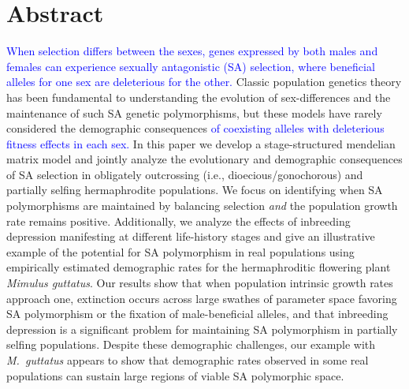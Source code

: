 \documentclass[11pt]{article}
\begin{document}
\linenumbers{}
\modulolinenumbers[3]

\newpage{}



\newpage{}
\section*{Abstract}


\textcolor{blue}{When selection differs between the sexes, genes expressed by both males and females can experience sexually antagonistic (SA) selection, where beneficial alleles for one sex are deleterious for the other.} Classic population genetics theory has been fundamental to understanding the evolution of sex-differences and the maintenance of such SA genetic polymorphisms, but these models have rarely considered the demographic consequences \textcolor{blue}{ of coexisting alleles with deleterious fitness effects in each sex.} In this paper we develop a stage-structured mendelian matrix model and jointly analyze the evolutionary and demographic consequences of SA selection in obligately outcrossing (i.e., dioecious/gonochorous) and partially selfing hermaphrodite populations. We focus on identifying when SA polymorphisms are maintained by balancing selection {\itshape and} the population growth rate remains positive. Additionally, we analyze the effects of inbreeding depression manifesting at different life-history stages and give an illustrative example of the potential for SA polymorphism in real populations using empirically estimated demographic rates for the hermaphroditic flowering plant {\itshape Mimulus guttatus}. Our results show that when population intrinsic growth rates approach one, extinction occurs across large swathes of parameter space favoring SA polymorphism or the fixation of male-beneficial alleles, and that inbreeding depression is a significant problem for maintaining SA polymorphism in partially selfing populations. Despite these demographic challenges, our example with {\itshape M.~guttatus} appears to show that demographic rates observed in some real populations can sustain large regions of viable SA polymorphic space.
\end{document}
